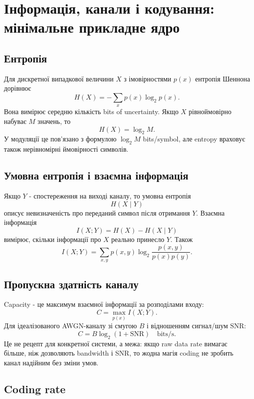 \chapter{Інформація, канали і кодування: мінімальне прикладне ядро}
\label{ch:information-coding-core}


\section{Ентропія}

Для дискретної випадкової величини $X$ з імовірностями $p(x)$ ентропія Шеннона дорівнює
\[
  H(X)=-\sum_{x}p(x)\log_2 p(x).
\]
Вона вимірює середню кількість bits of uncertainty. Якщо $X$ рівноймовірно набуває $M$ значень, то
\[
  H(X)=\log_2 M.
\]
У модуляції це пов'язано з формулою $\log_2 M$ bits/symbol, але entropy враховує також нерівномірні ймовірності символів.

\section{Умовна ентропія і взаємна інформація}

Якщо $Y$ - спостереження на виході каналу, то умовна ентропія
\[
  H(X\mid Y)
\]
описує невизначеність про переданий символ після отримання $Y$. Взаємна інформація
\[
  I(X;Y)=H(X)-H(X\mid Y)
\]
вимірює, скільки інформації про $X$ реально принесло $Y$. Також
\[
  I(X;Y)=\sum_{x,y} p(x,y)\log_2\frac{p(x,y)}{p(x)p(y)}.
\]

\section{Пропускна здатність каналу}

Capacity - це максимум взаємної інформації за розподілами входу:
\[
  C=\max_{p(x)} I(X;Y).
\]
Для ідеалізованого AWGN-каналу зі смугою $B$ і відношенням сигнал/шум $\mathrm{SNR}$:
\[
  C = B\log_2(1+\mathrm{SNR})\quad\text{bits/s}.
\]
Це не рецепт для конкретної системи, а межа: якщо raw data rate вимагає більше, ніж дозволяють bandwidth і SNR, то жодна магія coding не зробить канал надійним без зміни умов.

\section{Coding rate}

